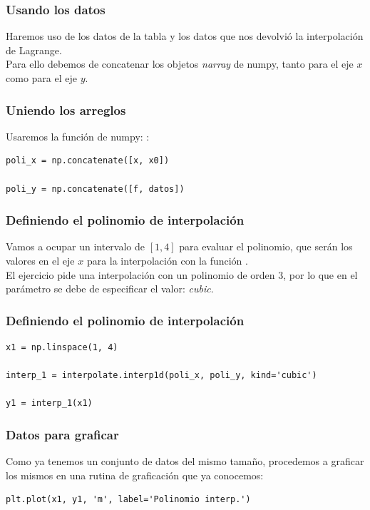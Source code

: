 \documentclass[12pt]{beamer}
\begin{document}
\begin{frame}
\frametitle{Usando los datos}
Haremos uso de los datos de la tabla y los datos que nos devolvió la interpolación de Lagrange.
\\
\bigskip
\pause
Para ello debemos de concatenar los objetos \textit{narray} de numpy, tanto para el eje $x$ como para el eje $y$.
\end{frame}
\begin{frame}[fragile]
\frametitle{Uniendo los arreglos}
Usaremos la función de numpy: :
\begin{lstlisting}[caption=Uniendo los arreglos]
poli_x = np.concatenate([x, x0])

poli_y = np.concatenate([f, datos])
\end{lstlisting}
\end{frame}
\begin{frame}[fragile]
\frametitle{Definiendo el polinomio de interpolación}
Vamos a ocupar un intervalo de $[1, 4]$ para evaluar el polinomio, que serán los valores en el eje $x$ para la interpolación con la función .
\\
\bigskip
\pause
El ejercicio pide una interpolación con un polinomio de orden $3$, por lo que en el parámetro  se debe de especificar el valor: \textit{cubic}.
\end{frame}
\begin{frame}[fragile]
\frametitle{Definiendo el polinomio de interpolación}
\begin{lstlisting}[caption=Definiendo el polinomio]
x1 = np.linspace(1, 4)

interp_1 = interpolate.interp1d(poli_x, poli_y, kind='cubic')

y1 = interp_1(x1)
\end{lstlisting}
\end{frame}
\begin{frame}[fragile]
\frametitle{Datos para graficar}
Como ya tenemos un conjunto de datos del mismo tamaño, procedemos a graficar los mismos en una rutina de graficación que ya conocemos:
\pause
\begin{lstlisting}[caption=Graficando los datos de interpolación]
plt.plot(x1, y1, 'm', label='Polinomio interp.')
\end{lstlisting}
\end{frame}
\end{document}
